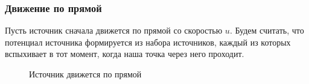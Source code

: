 \subsubsection{Движение по прямой}
Пусть источник сначала движется по прямой со скоростью $u$. Будем считать, что потенциал источника формируется из набора источников, каждый из которых вспыхивает в тот момент, когда наша точка через него проходит.
\begin{figure}[H]
\centering
\caption{Источник движется по прямой}
\label{lineIst}
\end{figure}

